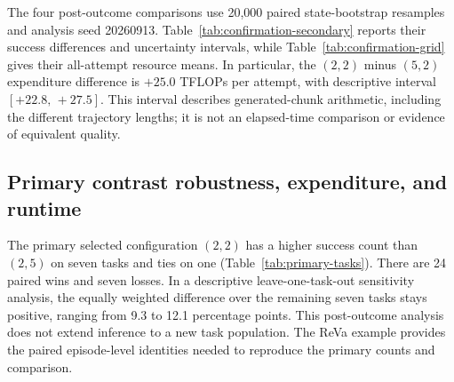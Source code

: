 \documentclass{article}
\begin{document}
\begin{table}[htbp]
\centering\small
\caption{Post-outcome descriptive comparisons using all 160 attempts per
setting. These contrasts were defined after collection began and were not
prespecified or fully outcome-blind. Intervals are task-conditional,
unadjusted, and do not test whether two settings preserve quality within a
prespecified margin.}
\label{tab:confirmation-secondary}

\end{table}
\FloatBarrier

The four post-outcome comparisons use
20,000 paired state-bootstrap resamples and analysis seed 20260913.
Table~\ref{tab:confirmation-secondary} reports their success differences and
uncertainty intervals, while
Table~\ref{tab:confirmation-grid} gives their all-attempt resource means.
In particular, the $(2,2)$ minus $(5,2)$ expenditure difference is
$+25.0$ TFLOPs per attempt, with descriptive interval $[+22.8,\,+27.5]$.
This interval describes generated-chunk arithmetic, including the different
trajectory lengths; it is not an elapsed-time comparison or evidence of
equivalent quality.

\FloatBarrier
\subsection{Primary contrast robustness, expenditure, and runtime}
\label{app:primary-costs}

The primary selected configuration $(2,2)$ has a higher success count than
$(2,5)$ on seven tasks and ties on one (Table~\ref{tab:primary-tasks}).
There are 24 paired wins and seven
losses. In a descriptive leave-one-task-out sensitivity analysis, the
equally weighted difference over the remaining seven tasks stays positive,
ranging from 9.3 to 12.1 percentage points. This post-outcome analysis does not
extend inference to a new task population. The ReVa example provides the paired episode-level identities needed to
reproduce the primary counts and comparison.

\begin{table}[htbp]
\centering\small
\caption{Descriptive primary expenditure differences, selected minus comparator
at $h=2$, including all attempts. Intervals use the paired state bootstrap
conditional on the eight tasks and were added after outcomes were observed.
Timing intervals summarize sampling variation in the observed data; incomplete
process-monitoring coverage remains a limitation. Differences use unrounded
means and may differ from subtraction of the displayed values.}
\label{tab:primary-costs}

\end{table}
\end{document}
